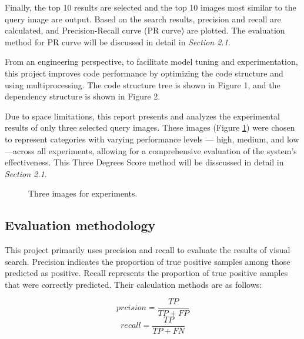 \documentclass{article}
\begin{document}
Finally, the top 10 results are selected and the top 10 images most similar to the query image are output. Based on the search results, precision and recall are calculated, and Precision-Recall curve (PR curve) are plotted. The evaluation method for PR curve will be discussed in detail in \textit{Section 2.1}.

From an engineering perspective, to facilitate model tuning and experimentation, this project improves code performance by optimizing the code structure and using multiprocessing. The code structure tree is shown in Figure 1, and the dependency structure is shown in Figure 2.

Due to space limitations, this report presents and analyzes the experimental results of only three selected query images. These images (Figure \ref{fig:images}) were chosen to represent categories with varying performance levels — high, medium, and low—across all experiments, allowing for a comprehensive evaluation of the system’s effectiveness. This Three Degrees Score method will be disscussed in detail in \textit{Section 2.1}.

\begin{figure}[!tbp]
  \centering
  \subfloat[1-2-s]{\texttt{[image: 1-2-s]}\label{fig:1-2-s}}
  \hfill
  \subfloat[10-17-s]{\texttt{[image: 10-17-s]}\label{fig:10-17-s}}
  \hfill
  \subfloat[17-10-s]{\texttt{[image: 17-10-s]}\label{fig:17-10-s}}
  \caption{\label{fig:images} Three images for experiments.}
\end{figure}


\subsection{Evaluation methodology}

This project primarily uses precision and recall to evaluate the results of visual search. Precision indicates the proportion of true positive samples among those predicted as positive. Recall represents the proportion of true positive samples that were correctly predicted. Their calculation methods are as follows:

\begin{equation}
  \label{eqn:pr}
  prcision = \frac{TP}{TP + FP}
  \end{equation}
\begin{equation}
  \label{eqn:pr}
  recall = \frac{TP}{TP + FN}
  \end{equation}
\end{document}
